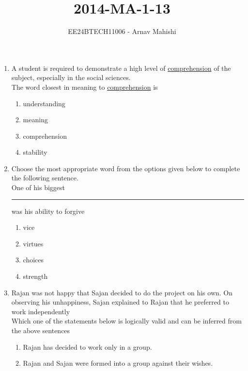 \documentclass[journal]{IEEEtran}
\begin{document}

\vspace{3cm}

\title{2014-MA-1-13}
\author{EE24BTECH11006 - Arnav Mahishi}
{\let\newpage\relax\maketitle}
\begin{enumerate}
\item{
A student is required to demonstrate a high level of \underline{comprehension} of the subject, especially in the social sciences.\\
The word closest in meaning to \underline{comprehension} is
\begin{multicols}{4}
\begin{enumerate}
\item understanding
\item meaning 
\item comprehension
\item stability
\end{enumerate}
\end{multicols}
}
\item{
Choose the most appropriate word from the options given below to complete the following sentence.\\
One of his biggest \rule{2cm}{0.15mm} was his ability to forgive
\begin{multicols}{4}
\begin{enumerate}
\item vice
\item virtues
\item choices 
\item strength
\end{enumerate}
\end{multicols}}
\item{
Rajan was not happy that Sajan decided to do the project on his own. On observing his unhappiness, Sajan explained to Rajan that he preferred to work independently\\
Which one of the statements below is logically valid and can be inferred from the above sentences
\begin{enumerate}
\item Rajan has decided to work only in a group.
\item Rajan and Sajan were formed into a group against their wishes.

\end{enumerate}}
\end{enumerate}
\end{document}
